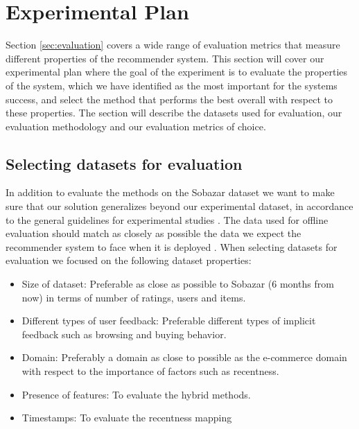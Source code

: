 \section{Experimental Plan}


Section \ref{sec:evaluation} covers a wide range of evaluation metrics that measure different properties of the recommender system. This section will cover our experimental plan where the goal of the experiment is to evaluate the properties of the system, which we have identified as the most important for the systems success, and select the method that performs the best overall with respect to these properties. The section will describe the datasets used for evaluation, our evaluation methodology and our evaluation metrics of choice.

\subsection{Selecting datasets for evaluation}

In addition to evaluate the methods on the Sobazar dataset we want to make sure that our solution generalizes beyond our experimental dataset, in accordance to the general guidelines for experimental studies \cite{Shani2011}. The data used for offline evaluation should match as closely as possible the data we expect the recommender system to face when it is deployed \cite{Gunawardana2009}. When selecting datasets for evaluation we focused on the following dataset properties:

\begin{itemize}
\item Size of dataset: Preferable as close as possible to Sobazar (6 months from now) in terms of number of ratings, users and items.
\item Different types of user feedback: Preferable different types of implicit feedback such as browsing and buying behavior.
\item Domain: Preferably a domain as close to possible as the e-commerce domain with respect to the importance of factors such as recentness.
\item Presence of features: To evaluate the hybrid methods.
\item Timestamps: To evaluate the recentness mapping
\end{itemize}

